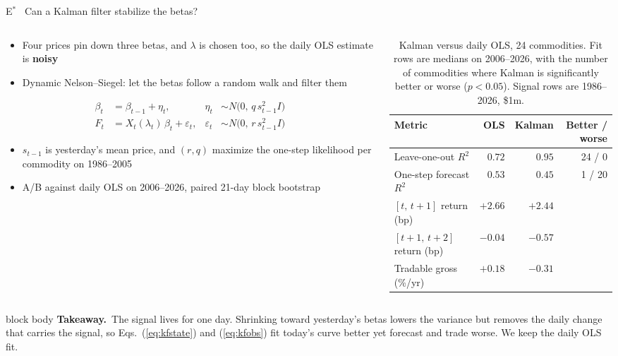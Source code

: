 \documentclass[10pt, aspectratio=169]{beamer}
\newcommand{\key}[1]{\textcolor{accent}{\textbf{#1}}}
\newcommand{\takeaway}[1]{%
  \vspace{0.6ex}%
  \begin{beamercolorbox}[rounded=true,sep=0.55ex,wd=\linewidth]{block body}%
    {\scriptsize\color{navy}\textbf{Takeaway.}~#1}%
  \end{beamercolorbox}}
\begin{document}
\begin{frame}{E$^{*}$ \textperiodcentered\ Can a Kalman filter stabilize the betas?}
\footnotesize
\begin{columns}[c, onlytextwidth]
\begin{column}{0.47\textwidth}
\begin{itemize}
  \item Four prices pin down three betas, and $\lambda$ is chosen too, so the
        daily OLS estimate is \key{noisy}
  \item Dynamic Nelson--Siegel: let the betas follow a random walk and filter
        them \parencite{diebold2006forecasting}
\end{itemize}
\vspace{-1.2ex}
{\scriptsize
\begin{align}
\beta_t &= \beta_{t-1}+\eta_t, & \eta_t &\sim N\bigl(0,\,q\,s_{t-1}^2 I\bigr) \label{eq:kfstate}\\
F_t &= X_t(\lambda_t)\,\beta_t+\varepsilon_t, & \varepsilon_t &\sim N\bigl(0,\,r\,s_{t-1}^2 I\bigr) \label{eq:kfobs}
\end{align}}
\vspace{-2ex}
\begin{itemize}
  \item $s_{t-1}$ is yesterday's mean price, and $(r,q)$ maximize the one-step
        likelihood per commodity on 1986--2005
  \item A/B against daily OLS on 2006--2026, paired 21-day block bootstrap
\end{itemize}
\end{column}
\begin{column}{0.51\textwidth}
\begin{table}
\centering
\scriptsize
\setlength{\tabcolsep}{3.5pt}
\begin{tabular}{@{}l r r r@{}}
\toprule
Metric & OLS & Kalman & Better / worse \\
\midrule
Leave-one-out $R^2$ & $0.72$ & $0.95$ & 24 / 0 \\
One-step forecast $R^2$ & $0.53$ & $0.45$ & 1 / 20 \\
\addlinespace[2pt]
$[t,\,t+1]$ return (bp) & $+2.66$ & $+2.44$ & \\
$[t+1,\,t+2]$ return (bp) & $-0.04$ & $-0.57$ & \\
Tradable gross (\%/yr) & $+0.18$ & $-0.31$ & \\
\bottomrule
\end{tabular}
\caption{Kalman versus daily OLS, 24 commodities. Fit rows are medians on
2006--2026, with the number of commodities where Kalman is significantly better
or worse ($p<0.05$). Signal rows are 1986--2026, \$1m.}
\end{table}
\end{column}
\end{columns}
\takeaway{The signal lives for one day. Shrinking toward yesterday's betas
lowers the variance but removes the daily change that carries the signal, so
Eqs.~(\ref{eq:kfstate}) and (\ref{eq:kfobs}) fit today's curve better yet
forecast and trade worse. We keep the daily OLS fit.}
\end{frame}
\end{document}
